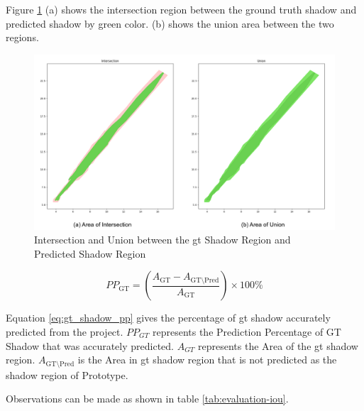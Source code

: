 Figure \ref{fig:evaluation-shadow_iou} (a) shows the intersection region between the ground truth shadow and predicted shadow by green color. (b) shows the union area between the two regions.

\begin{figure}[htbp]
    \centering
    \includegraphics[width=0.7\linewidth]{97_graphics//evaluation/shadow_iou.pdf}
    \caption{Intersection and Union between the \acrshort{gt} Shadow Region and Predicted Shadow Region}
    \label{fig:evaluation-shadow_iou}
\end{figure}

\begin{equation}\label{eq:gt_shadow_pp}
    PP_{\text{GT}} = \left( \frac{A_{\text{GT}} - A_{\text{GT}\setminus\text{Pred}}}{A_{\text{GT}}} \right) \times 100\%
\end{equation}

Equation \ref{eq:gt_shadow_pp} gives the percentage of \acrshort{gt} shadow accurately predicted from the project. \(PP_{GT}\) represents the Prediction Percentage of GT Shadow that was accurately predicted. \(A_{GT}\) represents the Area of the \acrfull{gt} shadow region. \(A_{\text{GT}\setminus\text{Pred}}\) is the Area in \acrshort{gt} shadow region that is not predicted as the shadow region of Prototype.

Observations can be made as shown in table \ref{tab:evaluation-iou}.


